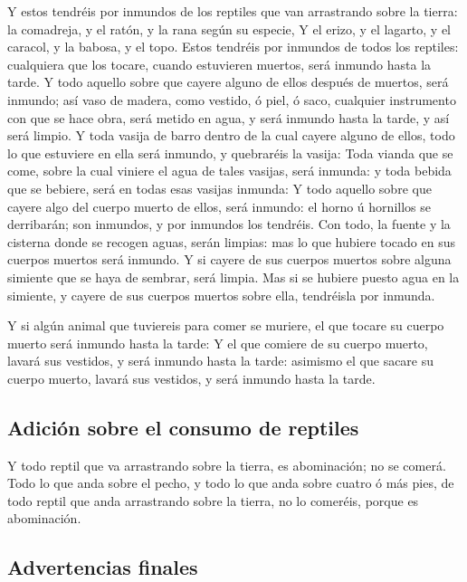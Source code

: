  Y estos tendréis por inmundos de los reptiles que van
arrastrando sobre la tierra: la comadreja, y el ratón, y la rana según
su especie,  Y el erizo, y el lagarto, y el caracol, y la
babosa, y el topo.  Estos tendréis por inmundos de todos
los reptiles: cualquiera que los tocare, cuando estuvieren muertos, será
inmundo hasta la tarde.  Y todo aquello sobre que cayere
alguno de ellos después de muertos, será inmundo; así vaso de madera,
como vestido, ó piel, ó saco, cualquier instrumento con que se hace
obra, será metido en agua, y será inmundo hasta la tarde, y así será
limpio.  Y toda vasija de barro dentro de la cual cayere
alguno de ellos, todo lo que estuviere en ella será inmundo, y
quebraréis la vasija:  Toda vianda que se come, sobre la
cual viniere el agua de tales vasijas, será inmunda: y toda bebida que
se bebiere, será en todas esas vasijas inmunda:  Y todo
aquello sobre que cayere algo del cuerpo muerto de ellos, será inmundo:
el horno ú hornillos se derribarán; son inmundos, y por inmundos los
tendréis.  Con todo, la fuente y la cisterna donde se
recogen aguas, serán limpias: mas lo que hubiere tocado en sus cuerpos
muertos será inmundo.  Y si cayere de sus cuerpos muertos
sobre alguna simiente que se haya de sembrar, será limpia. 
Mas si se hubiere puesto agua en la simiente, y cayere de sus cuerpos
muertos sobre ella, tendréisla por inmunda.

 Y si algún animal que tuviereis para comer se muriere, el
que tocare su cuerpo muerto será inmundo hasta la tarde:  Y
el que comiere de su cuerpo muerto, lavará sus vestidos, y será inmundo
hasta la tarde: asimismo el que sacare su cuerpo muerto, lavará sus
vestidos, y será inmundo hasta la tarde.

\hypertarget{adiciuxf3n-sobre-el-consumo-de-reptiles}{%
\subsection{Adición sobre el consumo de
reptiles}\label{adiciuxf3n-sobre-el-consumo-de-reptiles}}

 Y todo reptil que va arrastrando sobre la tierra, es
abominación; no se comerá.  Todo lo que anda sobre el
pecho, y todo lo que anda sobre cuatro ó más pies, de todo reptil que
anda arrastrando sobre la tierra, no lo comeréis, porque es abominación.

\hypertarget{advertencias-finales}{%
\subsection{Advertencias finales}\label{advertencias-finales}}

